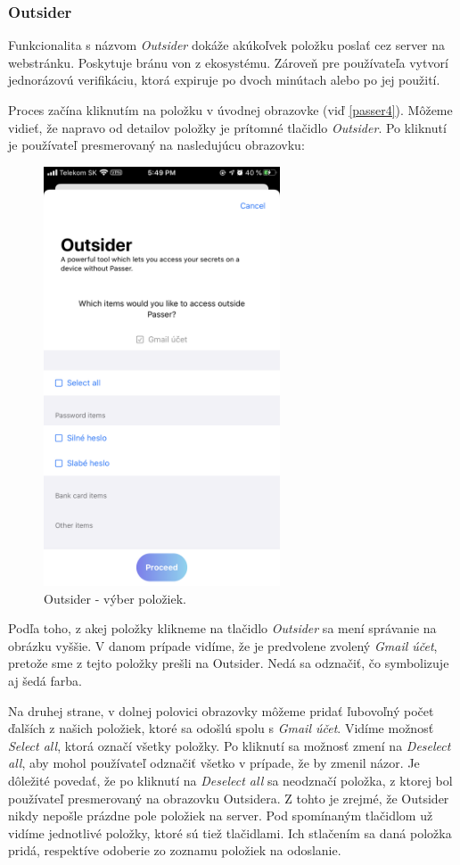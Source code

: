 \subsubsection{Outsider}
Funkcionalita s názvom \textit{Outsider} dokáže akúkoľvek položku poslať cez server na webstránku. Poskytuje bránu von z ekosystému. Zároveň pre používateľa vytvorí jednorázovú verifikáciu, ktorá expiruje po dvoch minútach alebo po jej použití.

Proces začína kliknutím na položku v úvodnej obrazovke (viď \figurename{ \ref{passer4}}). Môžeme vidieť, že napravo od detailov položky je prítomné tlačidlo \textit{Outsider}. Po kliknutí je používateľ presmerovaný na nasledujúcu obrazovku:

\begin{figure}[H]
  \centering
  \includegraphics[width=7cm]{img/passer6.PNG}
  \caption{Outsider - výber položiek.}
  \label{passer6}
\end{figure}

Podľa toho, z akej položky klikneme na tlačidlo \textit{Outsider} sa mení správanie na obrázku vyššie. V danom prípade vidíme, že je predvolene zvolený \textit{Gmail účet}, pretože sme z tejto položky prešli na Outsider. Nedá sa odznačiť, čo symbolizuje aj šedá farba. 

Na druhej strane, v dolnej polovici obrazovky môžeme pridať ľubovoľný počet ďalších z našich položiek, ktoré sa odošlú spolu s \textit{Gmail účet}. Vidíme možnosť \textit{Select all}, ktorá označí všetky položky. Po kliknutí sa možnosť zmení na \textit{Deselect all}, aby mohol používateľ odznačiť všetko v prípade, že by zmenil názor. Je dôležité povedať, že po kliknutí na \textit{Deselect all} sa neodznačí položka, z ktorej bol používateľ presmerovaný na obrazovku Outsidera. Z tohto je zrejmé, že Outsider nikdy nepošle prázdne pole položiek na server. Pod spomínaným tlačidlom už vidíme jednotlivé položky, ktoré sú tiež tlačidlami. Ich stlačením sa daná položka pridá, respektíve odoberie zo zoznamu položiek na odoslanie.

